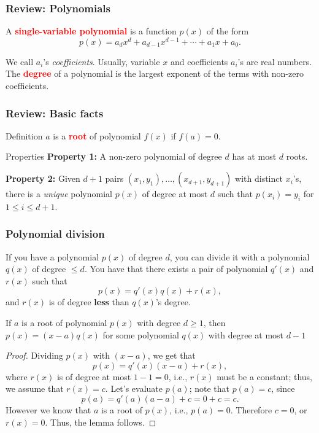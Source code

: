 

\begin{frame}
  \frametitle{Review: Polynomials}

  A \textcolor{red}{\bf single-variable polynomial} is a function
  $p(x)$ of the form
  \[
  p(x) = a_dx^d+a_{d-1}x^{d-1}+\cdots+a_1x+a_0.
  \]

  We call $a_i$'s {\em coefficients}.  Usually, variable $x$ and
  coefficients $a_i$'s are real numbers.  The \textcolor{red}{\bf
    degree} of a polynomial is the largest exponent of the terms with
  non-zero coefficients.
  
\end{frame}

\begin{frame}
  \frametitle{Review: Basic facts}

  \begin{block}{Definition}
    $a$ is a \textcolor{red}{\bf root} of polynomial $f(x)$ if
    $f(a)=0$.
  \end{block}
  
  \begin{block}{Properties}
    {\bf Property 1:} A non-zero polynomial of degree $d$ has at most
    $d$ roots.

    {\bf Property 2:} Given $d+1$ pairs
    $(x_1,y_1),\ldots,(x_{d+1},y_{d+1})$ with distinct $x_i$'s, there
    is a {\em unique} polynomial $p(x)$ of degree at most $d$ such
    that $p(x_i)=y_i$ for $1\leq i\leq d+1$.
  \end{block}
\end{frame}

\begin{frame}
  \frametitle{Polynomial division}
  \pause

  \begin{tcolorbox}
    If you have a polynomial $p(x)$ of degree $d$, you can divide it
    with a polynomial $q(x)$ of degree $\leq d$.  You have that there
    exists a pair of polynomial $q'(x)$ and $r(x)$ such that
    \[
    p(x) = q'(x)q(x) + r(x),
    \]
    and $r(x)$ is of degree {\bf less} than $q(x)$'s degree.
  \end{tcolorbox}
\end{frame}

\begin{frame}
  \begin{lemma}
    If $a$ is a root of polynomial $p(x)$ with degree $d\geq 1$, then
    $p(x)=(x-a)q(x)$ for some polynomial $q(x)$ with degree at most
    $d-1$
  \end{lemma}
  \begin{proof}
    \pause
    Dividing $p(x)$ with $(x-a)$, we get that
    \[
    p(x) = q'(x)(x-a) + r(x),
    \]
    where $r(x)$ is of degree at most $1-1=0$, i.e., $r(x)$ must be a
    constant; thus, we assume that $r(x)=c$.  Let's evaluate $p(a)$; note
    that $p(a)=c$, since
    \[
    p(a) = q'(a)(a-a) + c = 0 + c = c.
    \]
    However we know that $a$ is a root of $p(x)$, i.e., $p(a)=0$.
    Therefore $c=0$, or $r(x)=0$.  Thus, the lemma follows.
  \end{proof}
\end{frame}

